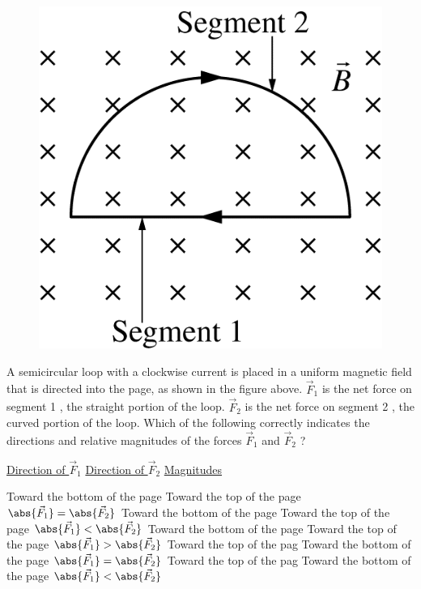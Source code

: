 \begin{figure}[H]
\centering
\includegraphics[scale=0.3]{images/img-016-024.png}
\end{figure}

\begin{questions}\setcounter{question}{34}\question
A semicircular loop with a clockwise current is placed in a uniform magnetic field that is directed into the page, as shown in the figure above. $\vec{F}_{1}$ is the net force on segment 1 , the straight portion of the loop. $\vec{F}_{2}$ is the net force on segment 2 , the curved portion of the loop. Which of the following correctly indicates the directions and relative magnitudes of the forces $\vec{F}_{1}$ and $\vec{F}_{2}$ ?

\tabto{ 0.75cm} \underline{Direction of $\vec{F}_{1}$}
\tabto{ 7.00cm} \underline{Direction of $\vec{F}_{2}$}
\tabto{13.25cm} \underline{Magnitudes}

\begin{choices}
\choice
    Toward the bottom of the page
    \tabto{6.25cm} Toward the top of the page
    \tabto{12.50cm} $\abs{\vec{F}_{1}} = \abs{\vec{F}_{2}}$
\choice
    Toward the bottom of the page
    \tabto{6.25cm} Toward the top of the page
    \tabto{12.50cm} $\abs{\vec{F}_{1}} < \abs{\vec{F}_{2}}$
\choice
    Toward the bottom of the page
    \tabto{6.25cm} Toward the top of the page
    \tabto{12.50cm} $\abs{\vec{F}_{1}} > \abs{\vec{F}_{2}}$
\choice
    Toward the top of the pag
    \tabto{6.25cm} Toward the bottom of the page
    \tabto{12.50cm} $\abs{\vec{F}_{1}} = \abs{\vec{F}_{2}}$
\choice
    Toward the top of the pag
    \tabto{6.25cm} Toward the bottom of the page
    \tabto{12.50cm} $\abs{\vec{F}_{1}} < \abs{\vec{F}_{2}}$
\end{choices}\end{questions}
